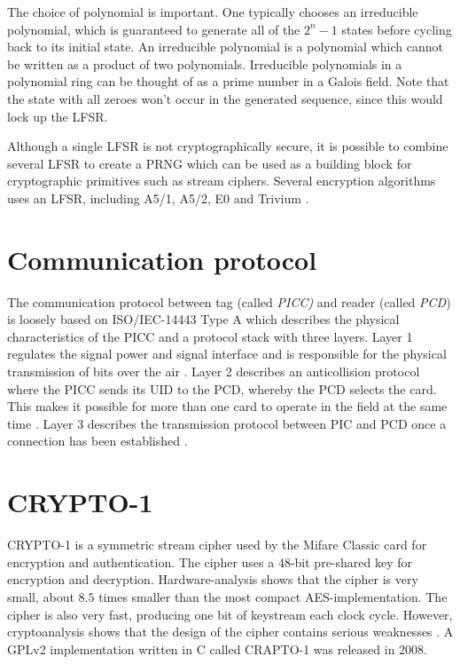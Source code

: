 \documentclass[10pt,twocolumn]{article}
\begin{document}
The choice of polynomial is important. One typically chooses an irreducible polynomial, which is guaranteed to generate all of the $2^n-1$ states before cycling back to its initial state. An irreducible polynomial is a polynomial which cannot be written as a product of two polynomials. Irreducible polynomials in a polynomial ring can be thought of as a prime number in a Galois field. Note that the state with all zeroes won't occur in the generated sequence, since this would lock up the LFSR.

Although a single LFSR is not cryptographically secure, it is possible to combine several LFSR to create a PRNG which can be used as a building block for cryptographic primitives such as stream ciphers. Several encryption algorithms uses an LFSR, including A5/1, A5/2, E0 and Trivium \cite{canniere}.

\section{Communication protocol}
\label{communication-protocol}
The communication protocol between tag (called \textit{PICC)} and reader (called \textit{PCD}) is loosely based on ISO/IEC-14443 Type A \cite{mifare-sheet} which describes the physical characteristics of the PICC and a protocol stack with three layers. Layer 1 regulates the signal power and signal interface and is responsible for the physical transmission of bits over the air \cite{iso14443-2}. Layer 2 describes an anticollision protocol where the PICC sends its UID to the PCD, whereby the PCD selects the card. This makes it possible for more than one card to operate in the field at the same time \cite{iso14443-3}. Layer 3 describes the transmission protocol between PIC and PCD once a connection has been established \cite{iso14443-4}.

\section{CRYPTO-1}
CRYPTO-1 is a symmetric stream cipher used by the Mifare Classic card for encryption and authentication. The cipher uses a 48-bit pre-shared key for encryption and decryption. Hardware-analysis shows that the cipher is very small, about $8.5$ times smaller than the most compact AES-implementation. The cipher is also very fast, producing one bit of keystream each clock cycle. However, cryptoanalysis shows that the design of the cipher contains serious weaknesses \cite{nohl08}. A GPLv2 implementation written in C called CRAPTO-1 was released in 2008.
\end{document}
